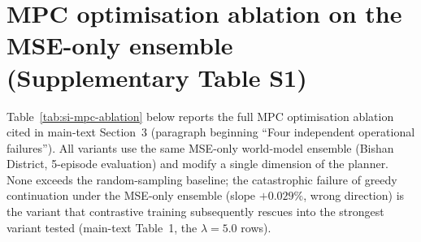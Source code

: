 \documentclass[11pt]{article}
\begin{document}
\section{MPC optimisation ablation on the MSE-only ensemble (Supplementary Table S1)}\label{si:s2-mpc-ablation}

Table~\ref{tab:si-mpc-ablation} below reports the full MPC optimisation ablation cited in main-text Section~3 (paragraph beginning ``Four independent operational failures''). All variants use the same MSE-only world-model ensemble (Bishan District, 5-episode evaluation) and modify a single dimension of the planner. None exceeds the random-sampling baseline; the catastrophic failure of greedy continuation under the MSE-only ensemble (slope $+0.029\%$, wrong direction) is the variant that contrastive training subsequently rescues into the strongest variant tested (main-text Table~1, the $\lambda{=}5.0$ rows).

\begin{table}[htbp]
\centering
\small
\caption{MPC optimisation ablation across four dimensions, on the MSE-only world-model ensemble (Bishan District). All variants start from the optimal $H{=}5$, $K{=}50$ random-reward configuration and modify one dimension. None exceeds the random-sampling baseline; aggressive exploitation (greedy continuation) actively reverses the slope direction. The diagnostic shows that the failure is structural to the learned model rather than to the search procedure.}
\label{tab:si-mpc-ablation}
\end{table}
\end{document}

